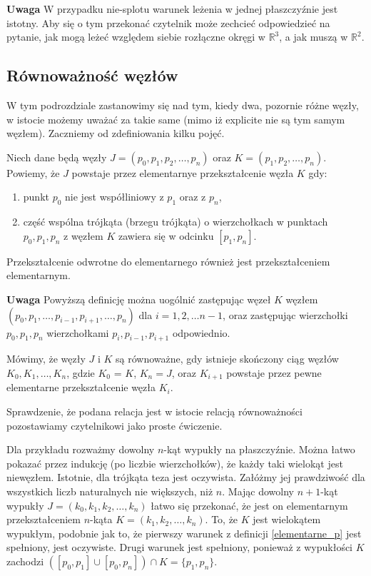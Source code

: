 \textbf{Uwaga} W przypadku nie-splotu warunek leżenia w jednej płaszczyźnie jest istotny. Aby się o tym przekonać czytelnik może zechcieć odpowiedzieć na pytanie,
jak mogą leżeć względem siebie rozłączne okręgi w $\mathbb{R}^3$, a jak muszą w $\mathbb{R}^2$.
 
\subsection{Równoważność węzłów}
W tym podrozdziale zastanowimy się nad tym, kiedy dwa, pozornie różne węzły, w istocie możemy uważać za takie same (mimo iż explicite nie są tym samym węzłem).
Zaczniemy od zdefiniowania kilku pojęć.
 
\begin{definicja}
\label{elementarne_p}
 Niech dane będą węzły $J = (p_0, p_1, p_2, \ldots, p_n)$ oraz $K = (p_1, p_2, \ldots, p_n)$.
 Powiemy, że $J$ powstaje przez elementarnye przekształcenie węzła $K$ gdy:
 \begin{enumerate}
  \item punkt $p_0$ nie jest współliniowy z $p_{1}$ oraz z $p_{n}$,
  \item część wspólna trójkąta (brzegu trójkąta) o wierzchołkach w punktach $p_0, p_1, p_n$ z węzłem $K$ zawiera się w odcinku $[p_1, p_n]$.
 \end{enumerate}
 Przekształcenie odwrotne do elementarnego również jest przekształceniem elementarnym.
\end{definicja}
\textbf{Uwaga} Powyższą definicję można uogólnić zastępując węzeł $K$ węzłem $(p_0, p_1,\ldots, p_{i-1},p_{i+1}, \ldots, p_n)$ dla $i = 1,2,\ldots n-1$, oraz zastępując wierzchołki
$p_0, p_1, p_n$ wierzchołkami $p_i, p_{i-1}, p_{i+1}$ odpowiednio.
 
\begin{definicja}
 Mówimy, że węzły $J$ i $K$ są równoważne, gdy istnieje skończony ciąg węzłów $K_0, K_1, \ldots, K_n$, gdzie $K_0$ = $K$, $K_n = J$, oraz $K_{i+1}$ powstaje przez pewne elementarne
 przekształcenie węzła $K_i$.
\end{definicja}
 
Sprawdzenie, że podana relacja jest w istocie relacją równoważności pozostawiamy czytelnikowi jako proste ćwiczenie.
 
Dla przykładu rozważmy dowolny $n$-kąt wypukły na płaszczyźnie. Można łatwo pokazać przez indukcję (po liczbie wierzchołków), że każdy taki wielokąt jest niewęzłem. Istotnie, dla trójkąta
teza jest oczywista. Załóżmy jej prawdziwość dla wszystkich liczb naturalnych nie większych, niż $n$. Mając dowolny $n+1$-kąt wypukły $J = (k_0, k_1, k_2, \ldots, k_n)$ łatwo się przekonać,
że jest on elementarnym przekształceniem $n$-kąta $ K = (k_1, k_2, \ldots, k_n)$. To, że $K$ jest wielokątem wypukłym, podobnie jak to, że pierwszy warunek z definicji \ref{elementarne_p} jest spełniony, jest oczywiste.
Drugi warunek jest spełniony, ponieważ z wypukłości $K$ zachodzi $\left([p_0,p_1]\cup [p_0, p_n]\right) \cap K = \lbrace p_1, p_n\rbrace$.
 
